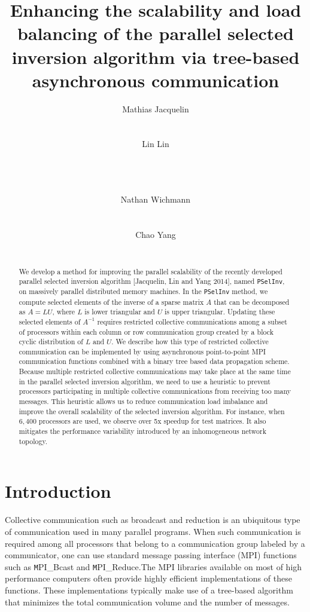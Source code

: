 \documentclass{acm_proc_article-sp}
\title{Enhancing the scalability and load balancing of the parallel
selected inversion algorithm via tree-based asynchronous communication}
\author{
\alignauthor
Mathias Jacquelin\\
   \affaddr{Lawrence Berkeley National Laboratory}\\
   \email{mjacquelin@lbl.gov}\\
\alignauthor
Lin Lin\\
   \affaddr{University of California Berkeley}\\
   \affaddr{Lawrence Berkeley National Laboratory}\\
   \email{linlin@math.berkeley.edu}\\
\and
\alignauthor
Nathan Wichmann\\
    \affaddr{Cray Inc.}\\
   \email{wichmann@cray.com}\\
\alignauthor
Chao Yang\\
    \affaddr{Lawrence Berkeley National Laboratory}
   \email{cyang@lbl.gov}\\
}
\begin{document}
\maketitle


\nocite{LinLuYingE2009,LinLuYingCarE2009,LinYangLuEtAl2011,LinYangMezaEtAl2011}


\begin{abstract}






We develop a method for improving the parallel scalability of the
recently developed parallel selected inversion algorithm [Jacquelin, Lin
and Yang 2014], named \texttt{PSelInv}, on massively parallel
distributed memory machines.  In the \texttt{PSelInv} method, we compute
selected elements of the inverse of a sparse matrix $A$ that can be
decomposed as $A = LU$, where $L$ is lower triangular and $U$ is upper
triangular. Updating these selected elements of $A^{-1}$ requires
restricted collective communications among a subset of processors within
each column or row communication group created by a block cyclic
distribution of $L$ and $U$.  We describe how this type of restricted
collective communication can be implemented by using asynchronous
point-to-point MPI communication functions combined with a binary tree
based data propagation scheme. Because multiple restricted collective
communications may take place at the same time in the parallel selected
inversion algorithm, we need to use a heuristic to prevent processors
participating in multiple collective communications from receiving too
many messages.  This heuristic allows us to reduce communication load
imbalance and improve the overall scalability of the selected inversion
algorithm.  For instance, when $6,400$ processors are used, we observe
over 5x speedup for test matrices. It also mitigates the performance
variability introduced by an inhomogeneous network topology.




\end{abstract}




\section{Introduction}\label{sec:intro}

Collective communication such as broadcast and reduction 
is an ubiquitous type of communication used in many 
parallel programs.  When such communication is required 
among all processors that belong to a communication group
labeled by a communicator, one can use standard message
passing interface (MPI) functions such as 
{\texttt MPI\_Bcast} and {\texttt MPI\_Reduce}.The MPI libraries available on most of high performance
computers often provide highly efficient implementations of
these functions. These implementations typically make use of
a tree-based algorithm that minimizes the total communication
volume and the number of messages.
\end{document}

